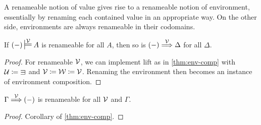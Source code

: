 A renameable notion of value gives rise to a renameable notion of environment,
essentially by renaming each contained value in an appropriate way.
On the other side, environments are always renameable in their codomains.

\begin{lemma}\label{thm:env-ren}
  If $\plr{-} \sdtstile{}\V A$ is renameable for all $A$, then so is
  $\plr{-} \env\V \Delta$ for all $\Delta$.
\end{lemma}
\begin{proof}
  For renameable $\mathcal V$, we can implement $\mathrm{lift}$ as in
  \cref{thm:env-comp} with $\U \coloneqq {\sqni}$ and
  $\mathcal V \coloneqq \mathcal W \coloneqq \mathcal V$.
  Renaming the environment then becomes an instance of environment composition.
\end{proof}
\begin{lemma}\label{thm:env-postren}
  $\Gamma \env\V \plr{-}$ is renameable for all $\mathcal V$ and $\Gamma$.
\end{lemma}
\begin{proof}
  Corollary of \cref{thm:env-comp}.
\end{proof}
